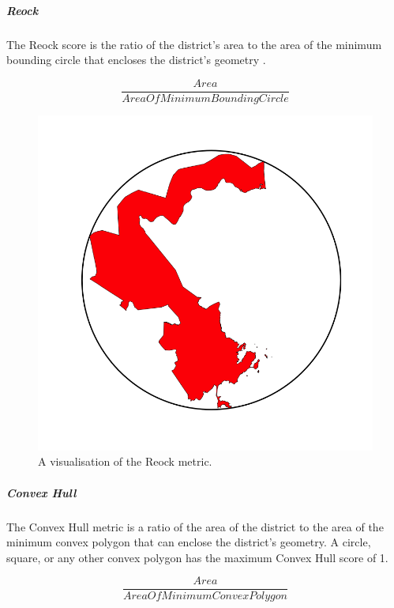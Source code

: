 \documentclass[]{article}
\let\oldsubparagraph\subparagraph
\renewcommand{\subparagraph}[1]{\oldsubparagraph{#1}\mbox{}}
\begin{document}
\hypertarget{reock}{%
\subparagraph{Reock}\label{reock}}

The Reock score is the ratio of the district's area to the area of the
minimum bounding circle that encloses the district's geometry
\citep{reock1961}.

\[\frac{Area}{AreaOfMinimumBoundingCircle}\]

\begin{figure}
\centering
\includegraphics{img/reock.png}
\caption{A visualisation of the Reock metric.}
\end{figure}

\hypertarget{convex-hull}{%
\subparagraph{Convex Hull}\label{convex-hull}}

The Convex Hull metric is a ratio of the area of the district to the
area of the minimum convex polygon that can enclose the district's
geometry. A circle, square, or any other convex polygon has the maximum
Convex Hull score of 1.

\[\frac{Area}{AreaOfMinimumConvexPolygon}\]
\end{document}
